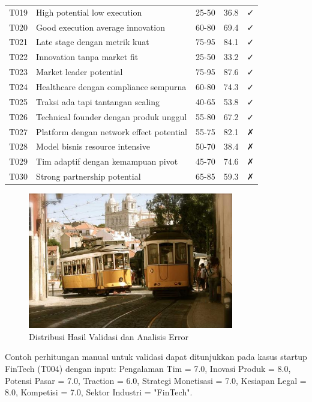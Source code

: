 \documentclass[12pt,a4paper]{article}
\begin{document}
\begin{table}[H]
\begin{tabular}{@{}clccc@{}}
T019 & High potential low execution & 25-50 & 36.8 & ✓ \\
T020 & Good execution average innovation & 60-80 & 69.4 & ✓ \\
T021 & Late stage dengan metrik kuat & 75-95 & 84.1 & ✓ \\
T022 & Innovation tanpa market fit & 25-50 & 33.2 & ✓ \\
T023 & Market leader potential & 75-95 & 87.6 & ✓ \\
T024 & Healthcare dengan compliance sempurna & 60-80 & 74.3 & ✓ \\
T025 & Traksi ada tapi tantangan scaling & 40-65 & 53.8 & ✓ \\
T026 & Technical founder dengan produk unggul & 55-80 & 67.2 & ✓ \\
T027 & Platform dengan network effect potential & 55-75 & 82.1 & ✗ \\
T028 & Model bisnis resource intensive & 50-70 & 38.4 & ✗ \\
T029 & Tim adaptif dengan kemampuan pivot & 45-70 & 74.6 & ✗ \\
T030 & Strong partnership potential & 65-85 & 59.3 & ✗ \\
\bottomrule
\end{tabular}
\end{table}

\begin{figure}[H]
    \centering
    \includegraphics[width=0.8\textwidth]{assets/image.png}
    \caption{Distribusi Hasil Validasi dan Analisis Error}
    \label{fig:validation-chart}
\end{figure}

Contoh perhitungan manual untuk validasi dapat ditunjukkan pada kasus startup FinTech (T004) dengan input: Pengalaman Tim = 7.0, Inovasi Produk = 8.0, Potensi Pasar = 7.0, Traction = 6.0, Strategi Monetisasi = 7.0, Kesiapan Legal = 8.0, Kompetisi = 7.0, Sektor Industri = "FinTech".
\end{document}
